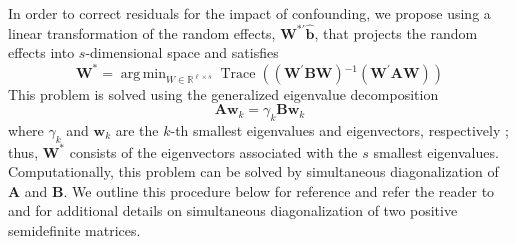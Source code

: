 \documentclass[12pt]{article} %
\newcommand{\al}[1]{{\color{red} #1}}
\newcommand{\inv}{\ensuremath{^{-1}}}
\newcommand{\ginv}{\ensuremath{^{-}}}
\newcommand{\trans}{\ensuremath{^\prime}}
\DeclareMathOperator{\tr}{Trace}
\DeclareMathOperator*{\argmin}{arg\,min}
\begin{document}
In order to correct residuals for the impact of confounding, we propose using a linear transformation of the random effects, $\bm{W}^{*\prime} \widehat{\bm{b}}$, that projects the random effects into $s$-dimensional space and satisfies
\begin{equation}\label{eq:minimize}
\bm{W}^* = \argmin_{W \in \mathbb{R}^{\ell \times s} } 
\tr\left( \left(\bm{W\trans B W} \right)\inv \left(\bm{W\trans A W}\right) \right)
\end{equation}
\al{This problem is solved using the generalized eigenvalue decomposition
\begin{equation}\label{eq:geigen}
	\bm{Aw}_k = \gamma_k \bm{Bw}_k
\end{equation}
where $\gamma_k$ and $\bm{w}_k$ are the $k$-th smallest eigenvalues and eigenvectors, respectively \citep{Fukunaga:1990}; thus, $\bm{W}^*$ consists of the eigenvectors associated with the $s$ smallest eigenvalues. Computationally, this problem can be solved by simultaneous diagonalization of $\bm{A}$ and $\bm{B}$. We outline this procedure below for reference and refer the reader to \cite{McDonald:1979ca} and \cite{deLeeuw:1982to} for additional details on simultaneous diagonalization of two positive semidefinite matrices.\\}
\end{document}
